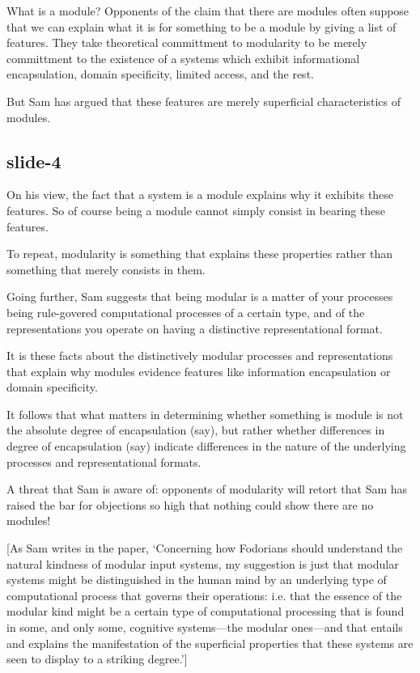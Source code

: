 \documentclass[12pt,\papersize]{extarticle}
\begin{document}
\setlength\footnotesep{1em}








What is a module?
Opponents of the claim that there are modules often suppose that we can explain
what it is for something to be a module by giving a list of features.
They take theoretical committment to modularity to be merely committment to the existence
of a systems which exhibit
informational encapsulation,
domain specificity,
limited access,
and the rest.

But Sam has argued that these features are merely superficial characteristics
of modules.

\subsection{slide-4}
On his view,
the fact that a system is a module explains why it exhibits these features.
So of course being a module cannot simply consist in bearing these features.

To repeat, modularity is something that explains these properties rather
than something that merely consists in them.

Going further, Sam suggests that being modular is a matter of your processes being
rule-govered computational processes of a certain type, and of the representations you
operate on having a distinctive representational format.

It is these facts about the distinctively modular processes and representations
that explain why modules evidence features like information encapsulation or domain
specificity.

It follows that
what matters in determining whether something is module
is not the absolute degree of encapsulation (say), but rather
whether differences in degree of encapsulation (say)  indicate
differences in the nature of the underlying processes and representational formats.

A threat that Sam is aware of: opponents of modularity will retort that Sam has
raised the bar for objections so high that nothing could show
there are no modules!

[As Sam writes in the paper,
‘Concerning how Fodorians should understand the natural kindness of modular input systems, my
suggestion is just that modular systems might be distinguished in the human mind by an underlying
type of computational process that governs their operations: i.e. that the essence of the modular
kind might be a certain type of computational processing that is found in some, and only some,
cognitive systems—the modular ones—and that entails and explains the manifestation of the
superficial properties that these systems are seen to display to a striking degree.’]
\end{document}
